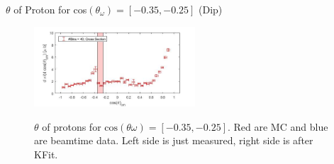 \documentclass[
		10pt
		]{beamer}
\begin{document}
\begin{frame}{$ \theta$ of Proton for cos$(\theta_{\omega})=[-0.35,-0.25]$ (Dip)}
	
	\begin{figure}
		\hspace{0cm}  \vspace{-1cm}
		\includegraphics[width=6cm]{Plots/7}
	\end{figure}
	
	
	\begin{figure}%
		\centering
		\qquad
		\captionsetup{labelformat=empty}
		\caption{$\theta$ of protons for $\textrm{cos}(\theta{\omega}) = [-0.35, -0.25] $. Red are MC and blue are beamtime data. Left side is just measured, right side is after KFit.}%
		\label{fig:example}%
	\end{figure}
	
\end{frame}
\end{document}
